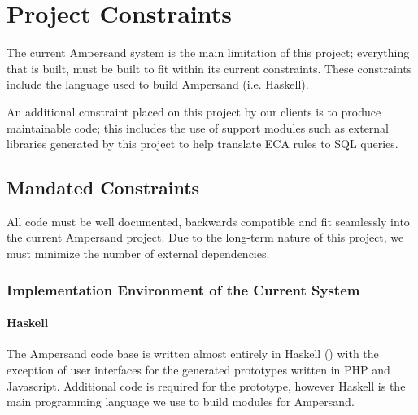 \documentclass[12pt]{report}
\begin{document}
\chapter{Project Constraints}\label{ch:Constraints}
The current Ampersand system is the main limitation of this project; 
everything 
that is built, must be built to fit within its current constraints. These 
constraints include the language used to build Ampersand (i.e. Haskell). 

An additional constraint placed on 
this project by our clients is to produce maintainable 
code; this includes the use of support modules such as external libraries
generated by this project to help translate ECA rules to SQL queries.

\section{Mandated Constraints}\label{sec:Constraints}

All code must be well documented, backwards compatible and fit seamlessly into 
the current Ampersand project. Due to the long-term nature of this project, we 
must minimize the number of external dependencies. 

\subsection{Implementation Environment of the Current System}
\subsubsection*{Haskell}
The Ampersand code base is written almost entirely in Haskell 
(\cite{ampSource}) with the exception of user interfaces for the generated 
prototypes written in PHP and Javascript. Additional code is required for the 
prototype, however Haskell is the main programming 
language we use to build modules for Ampersand. 
\end{document}
